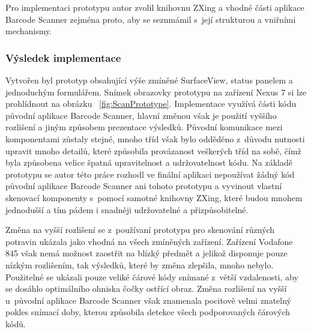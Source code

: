 \documentclass[thesis=B,czech]{FITthesis}[2013/10/20]
\begin{document}
Pro implementaci prototypu autor zvolil knihovnu ZXing a vhodné části aplikace Barcode Scanner zejména proto, aby se seznmámil s~její strukturou a vniřními mechanismy. 

\subsubsection{Výsledek implementace}

Vytvořen byl prototyp obsahující výše zmíněné SurfaceView, status panelem a jednoduchým formulářem. Snímek obrazovky prototypu na zařízení Nexus 7 si lze prohlídnout na obrázku  ~\ref{fig:ScanPrototype}. Implementace využívá části kódu původní aplikace Barcode Scanner, hlavní změnou však je použití vyššího rozlišení a jiným způsobem prezentace výsledků. Původní komunikace mezi komponentami zůstaly stejné, mnoho tříd však bylo odděděno z~důvodu nutnosti upravit mnoho detailů, které způsobila provázanost veškerých tříd na sobě, čímž byla způsobena velice špatná upravitelnost a udržovatelnost kódu. Na základě prototypu se autor této práce rozhodl ve finální aplikaci nepoužívat žádný kód původní aplikace Barcode Scanner ani tohoto prototypu a vyvinout vlastní skenovací komponenty s~pomocí samotné knihovny ZXing, které budou mnohem jednodušší a tím pádem i snadněji udržovatelné a přizpůsobitelné.

Změna na vyšší rozlišení se z~používaní prototypu pro skenování různých potravin ukázala jako vhodná na všech zmíněných zařízení. Zařízení Vodafone 845 však nemá možnost zaostřit na blízký předmět a jelikož disponuje pouze nízkým rozlišením, tak výsledků, které by změna zlepšila, mnoho nebylo. Použitelné se ukázali pouze veliké čárové kódy snímané z~větší vzdalenosti, aby se dosáhlo optimálního ohniska čočky ostřící obraz. Změna rozlišení na vyšší u~původní aplikace Barcode Scanner však znamenala pocitově velmi znatelný pokles snímací doby, kterou způsobila detekce všech podporovaných čárových kódů.
\end{document}
